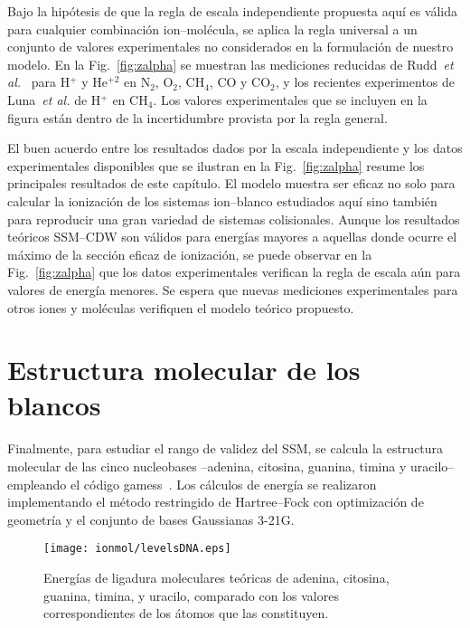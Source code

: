 Bajo la hipótesis de que la regla de escala independiente propuesta aquí 
es válida para cualquier combinación ion--molécula, se aplica la regla 
universal a un conjunto de valores experimentales no considerados en la
formulación de nuestro modelo. En la Fig.~\ref{fig:zalpha} se muestran 
las mediciones reducidas de Rudd~\textit{et al.}~\cite{Rudd:85,Rudd:83} 
para H$^{+}$ y He$^{+2}$ en N$_2$, O$_2$, CH$_4$, CO y CO$_2$, y los 
recientes experimentos de Luna~\textit{et al.} \cite{Luna2019} de 
H$^{+}$ en CH$_4$. Los valores experimentales que se incluyen en la 
figura están dentro de la incertidumbre provista por la regla general.

El buen acuerdo entre los resultados dados por la escala independiente y 
los datos experimentales disponibles que se ilustran en la 
Fig.~\ref{fig:zalpha} resume los principales resultados de este 
capítulo. El modelo muestra ser eficaz no solo para calcular la 
ionización de los sistemas ion--blanco estudiados aquí sino también 
para reproducir una gran variedad de sistemas colisionales. Aunque los 
resultados teóricos SSM--CDW son válidos para energías mayores a 
aquellas donde ocurre el máximo de la sección eficaz de ionización, 
se puede observar en la Fig.~\ref{fig:zalpha} que los datos 
experimentales verifican la regla de escala aún para valores de energía 
menores. Se espera que nuevas mediciones experimentales para otros 
iones y moléculas verifiquen el modelo teórico propuesto.

\section{Estructura molecular de los blancos}
\label{sec:molcalculations}

Finalmente, para estudiar el rango de validez del SSM, se calcula la 
estructura molecular de las cinco nucleobases --adenina, citosina, 
guanina, timina y uracilo-- empleando el código 
{\sc gamess}~\cite{gamess}. Los 
cálculos de energía se realizaron implementando el método restringido de 
Hartree--Fock con optimización de geometría y el conjunto de bases 
Gaussianas 3-21G. 

\begin{figure}[t]
\centering
\texttt{[image: ionmol/levelsDNA.eps]}
\caption[Energías de ligadura moleculares teóricas de ADN y ARN.]
{Energías de ligadura moleculares teóricas de adenina, citosina, 
guanina, timina, y uracilo, comparado con los valores correspondientes 
de los átomos que las constituyen.}
\label{fig:ADNbindener}
\end{figure}

